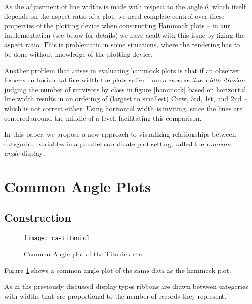 As the adjustment of line widths is made with respect to the angle $\theta$, which itself depends on the aspect ratio of a plot, we need complete control over these properties of the plotting device when constructing Hammock plots  -- in our implementation (see below for details) we have dealt with this issue by fixing the aspect ratio. This is problematic in some situations, where the rendering has to be done without knowledge of the plotting device. 

Another problem that arises in evaluating hammock plots is that if an observer focuses on horizontal line width  the plots suffer from a {\it reverse line width illusion}:  judging the number of survivors by class in figure \ref{hammock} based on horizontal line width  results in an ordering of (largest to smallest) Crew, 3rd, 1st, and 2nd -- which is not correct either. Using horizontal width is inviting, since the lines are centered around the middle of a level, facilitating this  comparison. 

In this paper, we propose a new approach to visualizing relationships between categorical variables in a parallel coordinate plot setting, called the {\it common angle} display. 


\section{ Common Angle Plots}
\subsection{Construction}


\begin{figure}[htbp] %
   \centering
   \texttt{[image: ca-titanic]} 
   \caption{ \label{fig:ca-titanic} Common Angle plot of the Titanic data. }
  \end{figure}

Figure \ref{fig:ca-titanic} shows a common angle plot of the same data as the hammock plot.

As in the previously discussed display types ribbons are drawn between categories with widths  that are proportional to  the number of records they represent.


